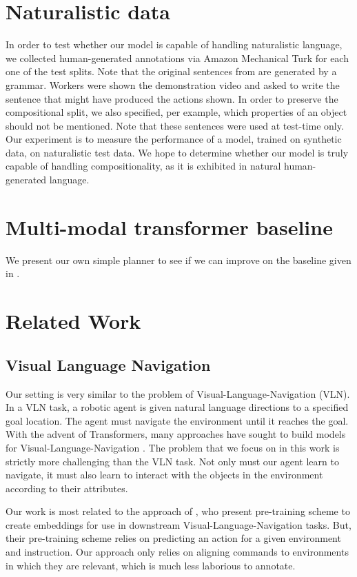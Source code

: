 \documentclass[11pt]{article}
\begin{document}
\section{Naturalistic data}
In order to test whether our model is capable of handling naturalistic language, we collected human-generated annotations via Amazon Mechanical Turk for each one of the test splits.
%
Note that the original sentences from \citet{ruis2020benchmark} are generated by a grammar.
%
Workers were shown the demonstration video and asked to write the sentence that might have produced the actions shown.
%
In order to preserve the compositional split, we also specified, per example, which properties of an object should not be mentioned.
%
Note that these sentences were used at test-time only.
%
Our experiment is to measure the performance of a model, trained on synthetic data, on naturalistic test data.
%
We hope to determine whether our model is truly capable of handling compositionality, as it is exhibited in natural human-generated language. 

\section{Multi-modal transformer baseline}
\label{transformer-planner}
We present our own simple planner to see if we can improve on the baseline given in \cite{ruis2020benchmark}.

\section{Related Work}
\subsection{Visual Language Navigation}
Our setting is very similar to the problem of Visual-Language-Navigation (VLN). 
%
In a VLN task, a robotic agent is given natural language directions to a specified goal location. 
%
The agent must navigate the environment until it reaches the goal.
%
With the advent of Transformers, many approaches have sought to build models for Visual-Language-Navigation \citep{magassouba2021crossmap, fang2019scene, Chen2020TopologicalPW}.
%
The problem that we focus on in this work is strictly more challenging than the VLN task. 
%
Not only must our agent learn to navigate, it must also learn to interact with the objects in the environment according to their attributes.

%
Our work is most related to the approach of \citet{Hao2020TowardsLA}, who present pre-training scheme to create embeddings for use in downstream Visual-Language-Navigation tasks.
%
But, their pre-training scheme relies on predicting an action for a given environment and instruction.
%
Our approach only relies on aligning commands to environments in which they are relevant, which is much less laborious to annotate.
%
\end{document}
